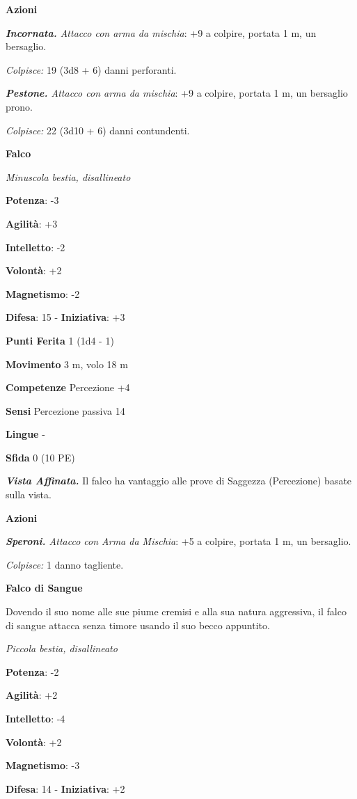 \begin{multicols}{2}
\smallskip\textbf{Azioni}

\emph{\textbf{Incornata.} Attacco con arma da mischia}: +9 a colpire,
portata 1 m, un bersaglio.

\emph{Colpisce:} 19 (3d8 + 6) danni perforanti.

\emph{\textbf{Pestone.} Attacco con arma da mischia}: +9 a colpire,
portata 1 m, un bersaglio prono.

\emph{Colpisce:} 22 (3d10 + 6) danni contundenti.

\textbf{Falco}

\emph{Minuscola bestia, disallineato}

\textbf{Potenza}: -3

\textbf{Agilità}: +3

\textbf{Intelletto}: -2

\textbf{Volontà}: +2

\textbf{Magnetismo}: -2

\textbf{Difesa}: 15 - \textbf{Iniziativa}: +3

\textbf{Punti Ferita} 1 (1d4 - 1)

\textbf{Movimento} 3 m, volo 18 m

\textbf{Competenze} Percezione +4

\textbf{Sensi} Percezione passiva 14

\textbf{Lingue} -

\textbf{Sfida} 0 (10 PE)\smallskip

\emph{\textbf{Vista Affinata.}} Il falco ha vantaggio alle prove di
Saggezza (Percezione) basate sulla vista.

\smallskip\textbf{Azioni}

\emph{\textbf{Speroni.} Attacco con Arma da Mischia}: +5 a colpire,
portata 1 m, un bersaglio.

\emph{Colpisce:} 1 danno tagliente.

\textbf{Falco di Sangue}

Dovendo il suo nome alle sue piume cremisi e alla sua natura aggressiva,
il falco di sangue attacca senza timore usando il suo becco appuntito.

\emph{Piccola bestia, disallineato}

\textbf{Potenza}: -2

\textbf{Agilità}: +2

\textbf{Intelletto}: -4

\textbf{Volontà}: +2

\textbf{Magnetismo}: -3

\textbf{Difesa}: 14 - \textbf{Iniziativa}: +2


\end{multicols}
